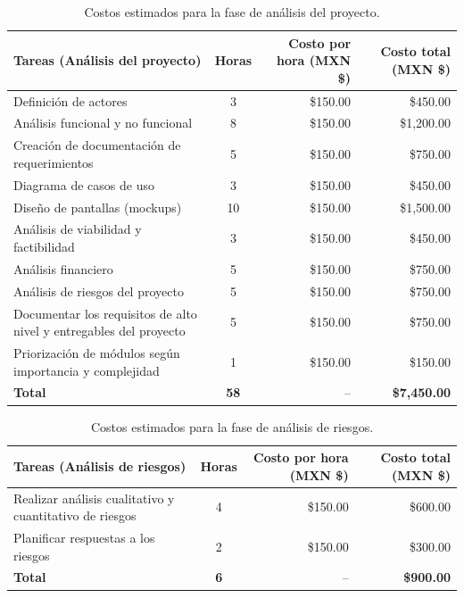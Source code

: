\begin{table}[H]
	\centering
	\renewcommand{\arraystretch}{1.6}
	\setlength{\tabcolsep}{10pt}
	\Huge
	\begin{adjustbox}{max width=\textwidth}
		\begin{tabular}{|p{9.5cm}|c|r|r|}
			\hline
			\textbf{Tareas (Análisis del proyecto)} & \textbf{Horas} & \textbf{Costo por hora (MXN \$)} & \textbf{Costo total (MXN \$)} \\ \hline
			Definición de actores & 3 & \$150.00 & \$450.00 \\ \hline
			Análisis funcional y no funcional & 8 & \$150.00 & \$1,200.00 \\ \hline
			Creación de documentación de requerimientos & 5 & \$150.00 & \$750.00 \\ \hline
			Diagrama de casos de uso & 3 & \$150.00 & \$450.00 \\ \hline
			Diseño de pantallas (mockups) & 10 & \$150.00 & \$1,500.00 \\ \hline
			Análisis de viabilidad y factibilidad & 3 & \$150.00 & \$450.00 \\ \hline
			Análisis financiero & 5 & \$150.00 & \$750.00 \\ \hline
			Análisis de riesgos del proyecto & 5 & \$150.00 & \$750.00 \\ \hline
			Documentar los requisitos de alto nivel y entregables del proyecto & 5 & \$150.00 & \$750.00 \\ \hline
			Priorización de módulos según importancia y complejidad & 1 & \$150.00 & \$150.00 \\ \hline
			\textbf{Total} & \textbf{58} & -- & \textbf{\$7,450.00} \\ \hline
		\end{tabular}
	\end{adjustbox}
	\caption{Costos estimados para la fase de análisis del proyecto.}
	\label{tab:costos_analisis_nuevo}
\end{table}

\begin{table}[H]
	\centering
	\renewcommand{\arraystretch}{1.6}
	\setlength{\tabcolsep}{10pt}
	\Huge
	\begin{adjustbox}{max width=\textwidth}
		\begin{tabular}{|p{9.5cm}|c|r|r|}
			\hline
			\textbf{Tareas (Análisis de riesgos)} & \textbf{Horas} & \textbf{Costo por hora (MXN \$)} & \textbf{Costo total (MXN \$)} \\ \hline
			Realizar análisis cualitativo y cuantitativo de riesgos & 4 & \$150.00 & \$600.00 \\ \hline
			Planificar respuestas a los riesgos & 2 & \$150.00 & \$300.00 \\ \hline
			\textbf{Total} & \textbf{6} & -- & \textbf{\$900.00} \\ \hline
		\end{tabular}
	\end{adjustbox}
	\caption{Costos estimados para la fase de análisis de riesgos.}
	\label{tab:costos_riesgos_nuevo}
\end{table}

